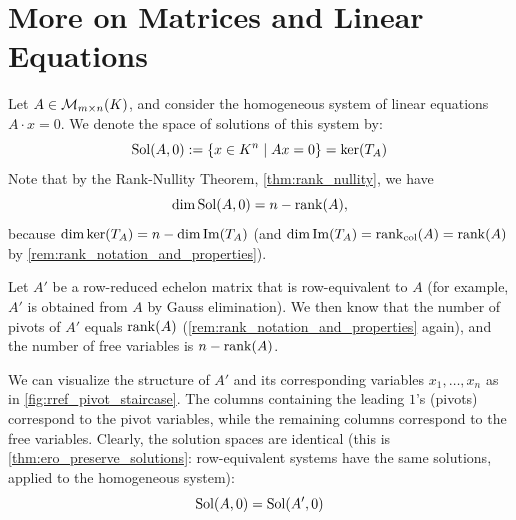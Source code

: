 \renewcommand{\thetheorem}{17.d.\arabic{theorem}}
\setcounter{theorem}{0}


\section{More on Matrices and Linear Equations}
\label{sec:more_matrices_lineq}

Let $A \in \mathcal{M}_{m \times n}(K)$, and consider the homogeneous system of linear equations $A \cdot x = 0$. We denote the space of solutions of this system by:
\begin{equation*}
    \operatorname{Sol}(A, 0) := \{x \in K^n \mid A x = 0\} = \ker(T_A)
\end{equation*}
Note that by the Rank-Nullity Theorem, \cref{thm:rank_nullity}, we have
\[\dim \operatorname{Sol}(A, 0) = n - \operatorname{rank}(A),\]
because $\dim \ker(T_A) = n - \dim \operatorname{Im}(T_A)$ (and $\dim \operatorname{Im}(T_A) = \operatorname{rank}_{\text{col}}(A) = \operatorname{rank}(A)$ by \cref{rem:rank_notation_and_properties}).

Let $A'$ be a row-reduced echelon matrix that is row-equivalent to $A$ (for example, $A'$ is obtained from $A$ by Gauss elimination). We then know that the number of pivots of $A'$ equals $\operatorname{rank}(A)$ (\cref{rem:rank_notation_and_properties} again), and the number of free variables is $n - \operatorname{rank}(A)$.

We can visualize the structure of $A'$ and its corresponding variables $x_1, \dots, x_n$ as in \cref{fig:rref_pivot_staircase}. The columns containing the leading $1$'s (pivots) correspond to the pivot variables, while the remaining columns correspond to the free variables. Clearly, the solution spaces are identical (this is \cref{thm:ero_preserve_solutions}: row-equivalent systems have the same solutions, applied to the homogeneous system):
\begin{equation*}
    \operatorname{Sol}(A, 0) = \operatorname{Sol}(A', 0)
\end{equation*}

